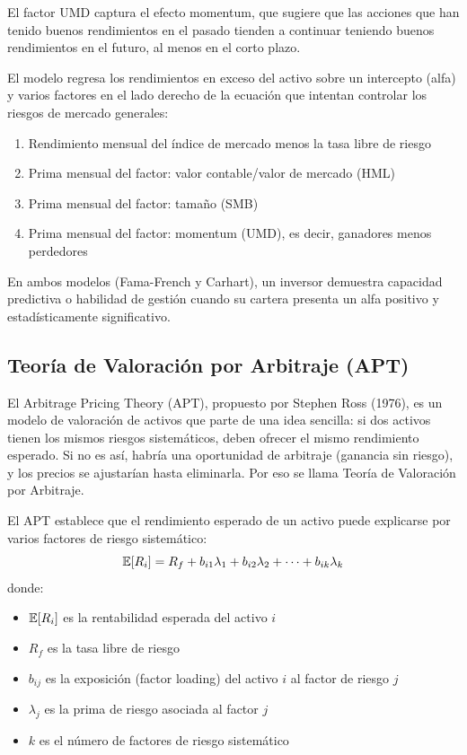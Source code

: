 El factor UMD captura el efecto momentum, que sugiere que las acciones que han tenido buenos rendimientos en el pasado tienden a continuar teniendo buenos rendimientos en el futuro, al menos en el corto plazo.

El modelo regresa los rendimientos en exceso del activo sobre un intercepto (alfa) y varios factores en el lado derecho de la ecuación que intentan controlar los riesgos de mercado generales:
\begin{enumerate}
\item Rendimiento mensual del índice de mercado menos la tasa libre de riesgo
\item Prima mensual del factor: valor contable/valor de mercado (HML)
\item Prima mensual del factor: tamaño (SMB)
\item Prima mensual del factor: momentum (UMD), es decir, ganadores menos perdedores
\end{enumerate}

En ambos modelos (Fama-French y Carhart), un inversor demuestra capacidad predictiva o habilidad de gestión cuando su cartera presenta un alfa positivo y estadísticamente significativo.

\subsection{Teoría de Valoración por Arbitraje (APT)}

El Arbitrage Pricing Theory (APT), propuesto por Stephen Ross (1976), es un modelo de valoración de activos que parte de una idea sencilla: si dos activos tienen los mismos riesgos sistemáticos, deben ofrecer el mismo rendimiento esperado. Si no es así, habría una oportunidad de arbitraje (ganancia sin riesgo), y los precios se ajustarían hasta eliminarla. Por eso se llama Teoría de Valoración por Arbitraje.

\begin{definicion}
El APT establece que el rendimiento esperado de un activo puede explicarse por varios factores de riesgo sistemático:
\begin{equation}
\mathbb{E}[R_i] = R_f + b_{i1}\lambda_1 + b_{i2}\lambda_2 + \cdots + b_{ik}\lambda_k
\end{equation}
donde:
\begin{itemize}
\item $\mathbb{E}[R_i]$ es la rentabilidad esperada del activo $i$
\item $R_f$ es la tasa libre de riesgo
\item $b_{ij}$ es la exposición (factor loading) del activo $i$ al factor de riesgo $j$
\item $\lambda_j$ es la prima de riesgo asociada al factor $j$
\item $k$ es el número de factores de riesgo sistemático
\end{itemize}
\end{definicion}

